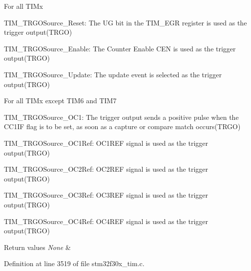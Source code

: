 \begin{DoxyItemize}
\item For all T\-I\-Mx \begin{DoxyItemize}
\item T\-I\-M\-\_\-\-T\-R\-G\-O\-Source\-\_\-\-Reset\-: The U\-G bit in the T\-I\-M\-\_\-\-E\-G\-R register is used as the trigger output(\-T\-R\-G\-O) \item T\-I\-M\-\_\-\-T\-R\-G\-O\-Source\-\_\-\-Enable\-: The Counter Enable C\-E\-N is used as the trigger output(\-T\-R\-G\-O) \item T\-I\-M\-\_\-\-T\-R\-G\-O\-Source\-\_\-\-Update\-: The update event is selected as the trigger output(\-T\-R\-G\-O)\end{DoxyItemize}

\item For all T\-I\-Mx except T\-I\-M6 and T\-I\-M7 \begin{DoxyItemize}
\item T\-I\-M\-\_\-\-T\-R\-G\-O\-Source\-\_\-\-O\-C1\-: The trigger output sends a positive pulse when the C\-C1\-I\-F flag is to be set, as soon as a capture or compare match occurs(\-T\-R\-G\-O) \item T\-I\-M\-\_\-\-T\-R\-G\-O\-Source\-\_\-\-O\-C1\-Ref\-: O\-C1\-R\-E\-F signal is used as the trigger output(\-T\-R\-G\-O) \item T\-I\-M\-\_\-\-T\-R\-G\-O\-Source\-\_\-\-O\-C2\-Ref\-: O\-C2\-R\-E\-F signal is used as the trigger output(\-T\-R\-G\-O) \item T\-I\-M\-\_\-\-T\-R\-G\-O\-Source\-\_\-\-O\-C3\-Ref\-: O\-C3\-R\-E\-F signal is used as the trigger output(\-T\-R\-G\-O) \item T\-I\-M\-\_\-\-T\-R\-G\-O\-Source\-\_\-\-O\-C4\-Ref\-: O\-C4\-R\-E\-F signal is used as the trigger output(\-T\-R\-G\-O)\end{DoxyItemize}

\begin{DoxyRetVals}{Return values}
{\em None} & \\
\hline
\end{DoxyRetVals}

\end{DoxyItemize}

Definition at line 3519 of file stm32f30x\-\_\-tim.\-c.

